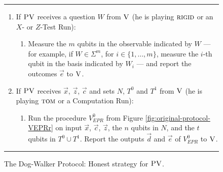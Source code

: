 \begin{figure}[H]
\rule[1ex]{\textwidth}{0.5pt}
\vspace{-20pt}
\begin{enumerate}
  \item If $\textsc{PV}$ receives a question ${W}$ from $\textsc{V}$ (he is playing $\textsc{rigid}$ or an $X$- or $Z$-Test Run):
\begin{enumerate}
     \item[]  Measure the $m$ qubits in the observable indicated by $W$ --- for example, if $W\in \Sigma^m$, for $i\in \{1,\ldots,m\}$, measure the $i$-th qubit in the basis indicated by $W_i$ --- and report the outcomes $\vec{e}$ to $\textsc{V}$.
\end{enumerate}

  \item If $\textsc{PV}$ receives $\vec{x}$, $\vec{z}$, $\vec{c}$ and sets $N$, $T^0$ and $T^1$ from $\textsc{V}$ (he is playing $\textsc{tom}$ or a Computation Run):
\begin{enumerate}
	\item[] Run the procedure $V_{EPR}^0$ from Figure \ref{fig:original-protocol-VEPRr} on input $\vec{x}$, $\vec{c}$, $\vec{z}$, the $n$ qubits in $N$, and the $t$ qubits in $T^0\cup T^1$. Report the outputs  $\vec{d}$ and $\vec{e}$ of $V_{EPR}^0$ to $\textsc{V}$.
\end{enumerate}
\end{enumerate}
\rule[2ex]{\textwidth}{0.5pt}\vspace{-.5cm}
\caption{The Dog-Walker Protocol: Honest strategy for $\textsc{PV}$.}\label{fig:dogwalker-protocol-PV}
\end{figure}

